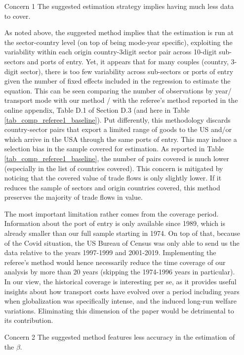 \documentclass[a4paper,11pt]{article}
\begin{document}
\begin{itemize}
\item[Concern 1] The suggested estimation strategy implies having much less data to cover.

As noted above, the suggested method implies that the estimation is run at the sector-country level (on top of being mode-year specific), exploiting the variability within each origin country-3digit sector pair across 10-digit sub-sectors and ports of entry. Yet, it appears that for many couples (country, 3-digit sector), there is too few variability across sub-sectors or ports of entry given the number of fixed effects included in the regression to estimate the equation. This can be seen comparing the number of observations by year/ transport mode with our method / with the referee's method reported in the online appendix, Table D.1 of Section D.3 (and here in Table \ref{tab_comp_referee1_baseline}). Put differently, this methodology discards country-sector pairs that export a limited range of goods to the US and/or which arrive in the USA through the same ports of entry. This may induce a selection bias in the sample covered for estimation. As reported in Table  \ref{tab_comp_referee1_baseline}, the number of pairs covered is much lower (especially in the list of countries covered). This concern is mitigated by noticing that the covered value of trade flows is only slightly lower. If it reduces the sample of sectors and origin countries covered, this method preserves the majority of trade flows in value.

The most important limitation rather comes from the coverage period. Information about the port of entry is only available since 1989, which is already smaller than our full sample starting in 1974. On top of that, because of the Covid situation, the US Bureau of Census was only able to send us the data relative to the years 1997-1999 and 2001-2019. Implementing the referee's method would hence necessarily reduce the time coverage of our analysis by more than 20 years (skipping the 1974-1996 years in particular). In our view, the historical coverage is interesting per se, as it provides useful insights about how transport costs have evolved over a period including years when globalization was specifically intense, and the induced long-run welfare variations. Eliminating this dimension of the paper would be detrimental to its contribution.


\item[Concern 2] The suggested method features less accuracy in the estimation of the $\beta$.


\end{itemize}
\end{document}
